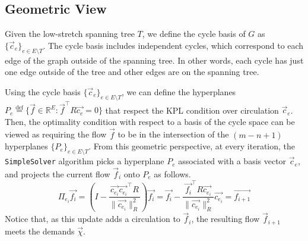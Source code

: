 \subsection{Geometric View}
\label{section:geometric-view}
Given the low-stretch spanning tree $T$, we define the cycle basis of $G$ as $\{\overrightarrow{c}_e\}_{e \in E \setminus T}$. The cycle basis includes independent cycles, which correspond to each edge of the graph outside of the spanning tree. In other words, each cycle has just one edge outside of the tree and other edges are on the spanning tree. 


Using the cycle basis $\{\overrightarrow{c}_e\}_{e \in E \setminus T}$, we can define the hyperplanes $P_e \stackrel{\text{def}}{=} \{\overrightarrow{f} \in \mathds{R}^E: \overrightarrow{f}^\top R \overrightarrow{c_e}=0\}$ that respect the KPL condition over circulation $\overrightarrow{c}_e$. Then, the optimality condition with respect to a basis of the cycle space can be viewed as requiring the flow $\overrightarrow{f}$ to be in the intersection of the $(m-n+1)$ hyperplanes $\{P_e\}_{e \in E \setminus T}$.
From this geometric perspective, at every iteration, the \texttt{SimpleSolver} algorithm picks a hyperplane $P_e$ associated with
a basis vector $\overrightarrow{c}_e$, and projects the current flow $\overrightarrow{f}_i$ onto $P_e$ as follows.
\begin{equation}
\label{eq:geometric-projection}
    \Pi_{e_i} \overrightarrow{f_i}=(I-\frac{\overrightarrow{c_{e_i}}\overrightarrow{c_{e_i}}^\top R}{\|\overrightarrow{c_{e_i}}\|_R^2})\overrightarrow{f_i}=\overrightarrow{f_i} - \frac{\overrightarrow{f_i}^\top R \overrightarrow{c_{e_i}}}{\|\overrightarrow{c_{e_i}}\|_R^2}\overrightarrow{c_{e_i}}=\overrightarrow{f_{i+1}}
\end{equation}
Notice that, as this update adds a circulation to $\overrightarrow{f}_i$, the resulting flow $\overrightarrow{f}_{i+1}$ meets the demands $\overrightarrow{\chi}$. 

